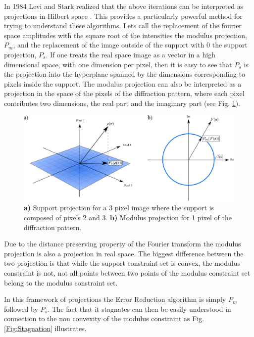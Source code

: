 In 1984 Levi and Stark realized that the above iterations can be
interpreted as projections in Hilbert space \cite{Levi84}. This provides a
particularly powerful method for trying to understand these algorithms.
Lets call the replacement of the fourier space amplitudes with the square root of
the intensities the modulus projection, $P_m$, and the replacement of the image
outside of the support with 0 the support projection, $P_s$. If one treats the
real space image as a vector in a high dimensional space, with one dimension per
pixel, then it is easy to see that $P_s$ is the projection into the hyperplane
spanned by the dimensions corresponding to pixels inside the support. The
modulus projection can also be interpreted as a projection in the space of the
pixels of the diffraction pattern, where each pixel contributes two dimensions,
the real part and the imaginary part (see Fig. \ref{Fig:Projections}). 

\begin{figure}[h]
  \centering
  \includegraphics[width=1 \columnwidth]{Image_Reconstruction/projections.png}
  \caption{{\bf a)} Support projection for a 3 pixel image where the support is
    composed of pixels 2 and 3. {\bf b)} Modulus projection for 1 pixel of the
    diffraction pattern.}
  \label{Fig:Projections}
\end{figure}

Due to the distance preserving property of the Fourier transform the modulus
projection is also a projection in real space. The biggest difference between
the two projection is that while the support constraint set is convex, the
modulus constraint is not, not all points between two points of the modulus
constraint set belong to the modulus constraint set.

In this framework of projections the Error Reduction algorithm is simply $P_m$
followed by $P_s$. The fact that it stagnates can then be easily understood in
connection to the non convexity of the modulus constraint as
Fig. \ref{Fig:Stagnation} illustrates.

